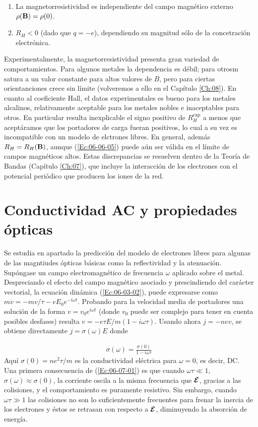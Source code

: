 \begin{enumerate}
	\item La magnetorresistividad es independiente del campo magnético externo $\rho(\mathbf{B})=\rho(0)$.
	\item $R_H<0$ (dado que $q=-e$), dependiendo su magnitud sólo de la concetración electrónica. 
\end{enumerate}
Experimentalmente, la magnetorresistividad presenta gran variedad de comportamientos. Para algunos metales la dependencia es débil; para otrosm satura a un valor constante para altos valores de $B$, pero para ciertas orientanciones crece sin límite (volveremos a ello en el Capítulo \ref{Ch:08}). En cuanto al coeficiente Hall, el datos experimentales es bueno para los metales alcalinos, relativamente aceptable para los metales nobles e inaceptables para otros. En particular resulta inexplicable el signo positivo de $R_H^{\text{exp}}$ a menos que aceptáramos que los portadores de carga fueran positivos, lo cual a su vez es incompatible con un modelo de elctrones libres. En general, además $R_H = R_H (\mathbf{B})$, aunque (\ref{Ec:06-06-05}) puede aún ser válida en el límite de campos magnéticos altos. Estas discrepancias se resuelven dentro de la Teoría de Bandas (Capítulo \ref{Ch:07}), que incluye la interacción de los electrones con el potencial periódico que producen los iones de la red.

\section{Conductividad AC y propiedades ópticas}

Se estudia en apartado la predicción del modelo de electrones libres para algunas de las magntiudes ópticas básicas como la reflectividad y la atenuación. Supóngase un campo electromagnético de frecuencia $\omega$ aplicado sobre el metal. Despreciando el efecto del campo magnético asociado y prescindiendo del carácter vectorial, la ecuación dinámica (\ref{Ec:06-03-02}), puede expresarse como $m\dot{v}=-mv/\tau-eE_0e^{-i\omega t}$. Probando para la velocidad media de portadores una solución de la forma $v=v_0 e^{i\omega t}$ (donde $v_0$ puede ser complejo para tener en cuenta posibles desfases) resulta $v=-e\tau E / m(1-i\omega\tau)$. Usando ahora $j=-nev$, se obtiene directamente $j=\sigma(\omega)E$ donde 
 
\begin{eqnarray}
	\sigma (\omega) = \frac{\sigma(0)}{1-i \omega \tau} \label{Ec:06-07-01}
\end{eqnarray}
Aquí $\sigma (0) = ne^2 \tau/m$ es la conductividad eléctrica para $\omega=0$, es decir, DC. Una primera consecuencia de (\ref{Ec:06-07-01}) es que cuando $\omega \tau \ll 1$, $\sigma (\omega) \approx \sigma (0)$, la corriente oscila a la misma frecuencia que $\boldsymbol{\mathcal{E}}$, gracias a las colisiones, y el comportamiento es puramente resistivo. Sin embargo, cuando $\omega \tau \gg 1$ las colisiones no son lo suficientemente frecuentes para frenar la inercia de los electrones y éstos se retrasan con respecto a $\boldsymbol{\mathcal{E}}$, diminuyendo la absorción de energía.


